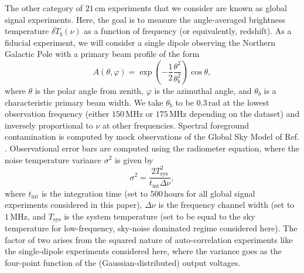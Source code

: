 \documentclass[twocolumn,aps,prd,nofootinbib,showpacs,superscriptaddress]{revtex4-1}
\begin{document}
The other category of $21\,\textrm{cm}$ experiments that we consider are known as global signal experiments. Here, the goal is to measure the angle-averaged brightness temperature $\overline{\delta T}_b(\nu)$ as a function of frequency (or equivalently, redshift). As a fiducial experiment, we will consider a single dipole observing the Northern Galactic Pole with a primary beam profile of the form
\begin{equation}
A(\theta, \varphi) = \exp \left( -\frac{1}{2} \frac{\theta^2}{\theta_b^2} \right) \cos \theta,
\end{equation}
where $\theta$ is the polar angle from zenith, $\varphi$ is the azimuthal angle, and $\theta_b$ is a characteristic primary beam width. We take $\theta_b$ to be $0.3\,\textrm{rad}$ at the lowest observation frequency (either $150\,\textrm{MHz}$ or $175\,\textrm{MHz}$ depending on the dataset) and inversely proportional to $\nu$ at other frequencies. Spectral foreground contamination is computed by mock observations of the Global Sky Model of Ref. \cite{deOliveiraCosta_et_al2008}. Observational error bars are computed using the radiometer equation, where the noise temperature variance $\sigma^2$ is given by
\begin{equation}
\sigma^2 = \frac{2 T_\textrm{sys}^2}{t_\textrm{int} \Delta \nu},
\end{equation}
where $t_\textrm{int}$ is the integration time (set to $500\,\textrm{hours}$ for all global signal experiments considered in this paper), $\Delta \nu$ is the frequency channel width (set to $1\,\textrm{MHz}$, and $T_\textrm{sys}$ is the system temperature (set to be equal to the sky temperature for low-frequency, sky-noise dominated regime considered here). The factor of two arises from the squared nature of auto-correlation experiments like the single-dipole experiments considered here, where the variance goes as the four-point function of the (Gaussian-distributed) output voltages.
\end{document}
